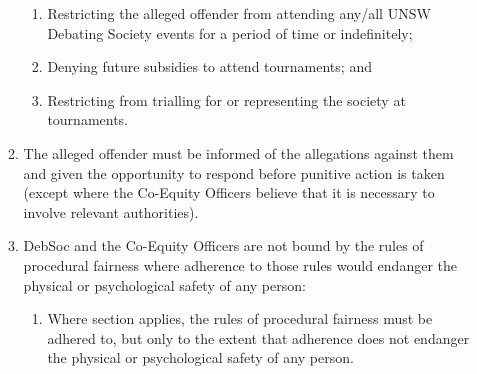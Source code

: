 \begin{enumerate}
\begin{enumerate}
    \begin{enumerate}
    \item Restricting the alleged offender from attending any/all UNSW Debating Society events for a period of time or indefinitely;
    \item Denying future subsidies to attend tournaments; and
    \item Restricting from trialling for or representing the society at tournaments.
    \end{enumerate}
  \item The alleged offender must be informed of the allegations against them and given the opportunity to respond before punitive action is taken (except where the Co-Equity Officers believe that it is necessary to involve relevant authorities).
  \item DebSoc and the Co-Equity Officers are not bound by the rules of procedural fairness where adherence to those rules would endanger the physical or psychological safety of any person: \label{procedural_fairness}
    \begin{enumerate}
    \item Where section  applies, the rules of procedural fairness must be adhered to, but only to the extent that adherence does not endanger the physical or psychological safety of any person.
    \end{enumerate}
  \end{enumerate}
\end{enumerate}
